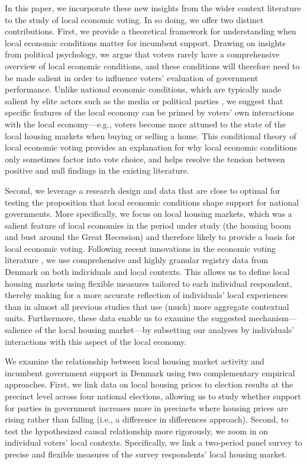 \documentclass[12pt,a4paper]{article}
\begin{document}
	In this paper, we incorporate these new insights from the wider context literature to the study of local economic voting. In so doing, we offer two distinct contributions. First, we provide a theoretical framework for understanding when local economic conditions matter for incumbent support. Drawing on insights from political psychology, we argue that voters rarely have a comprehensive overview of local economic conditions, and these conditions will therefore need to be made salient in order to influence voters’ evaluation of government performance. Unlike national economic conditions, which are typically made salient by elite actors such as the media \citep{hart2013can} or political parties \citep{bisgaard2017partisan}, we suggest that specific features of the local economy can be primed by voters’ own interactions with the local economy—e.g., voters become more attuned to the state of the local housing markets when buying or selling a home. This conditional theory of local economic voting provides an explanation for why local economic conditions only sometimes factor into vote choice, and helps resolve the tension between positive and null findings in the existing literature.
	
	Second, we leverage a research design and data that are close to optimal for testing the proposition that local economic conditions shape support for national governments. More specifically, we focus on local housing markets, which was a salient feature of local economies in the period under study (the housing boom and bust around the Great Recession) and therefore likely to provide a basis for local economic voting. Following recent innovations in the economic voting literature \citep{healy2017digging}, we use comprehensive and highly granular registry data from Denmark on both individuals and local contexts. This allows us to define local housing markets using flexible measures tailored to each individual respondent, thereby making for a more accurate reflection of individuals’ local experiences than in almost all previous studies that use (much) more aggregate contextual units. Furthermore, these data enable us to examine the suggested mechanism—salience of the local housing market—by subsetting our analyses by individuals’ interactions with this aspect of the local economy.  
	
	We examine the relationship between local housing market activity and incumbent government support in Denmark using two complementary empirical approaches. First, we link data on local housing prices to election results at the precinct level across four national elections, allowing us to study whether support for parties in government increases more in precincts where housing prices are rising rather than falling (i.e., a difference in differences approach). Second, to test the hypothesized causal relationship more rigorously, we zoom in on individual voters' local contexts. Specifically, we link a two-period panel survey to precise and flexible measures of the survey respondents’ local housing market.
	
\end{document}
